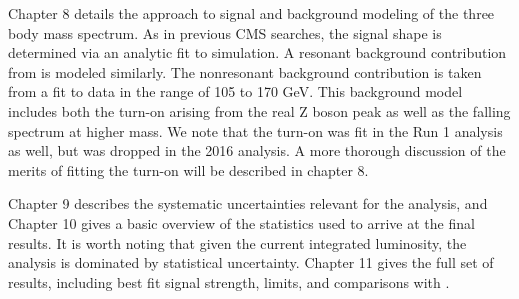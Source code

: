 Chapter 8 details the approach to signal and background modeling of the three body 
mass spectrum. As in previous CMS \hzg searches, the 
signal shape is determined via an analytic fit to simulation. A resonant background 
contribution from \hmumu is modeled similarly. The nonresonant 
background contribution is taken from a fit to data in the range of 105 to 170 GeV. This 
background model includes both the turn-on arising from the real Z boson peak as well as 
the falling spectrum at higher mass. We note that the turn-on was fit in the Run 1 analysis as 
well, but was dropped in the 2016 analysis. A more thorough discussion of the merits of fitting 
the turn-on will be described in chapter 8.

Chapter 9 describes the systematic uncertainties relevant for the analysis, and Chapter 10
gives a basic overview of the statistics used to arrive at the final results. It is 
worth noting that given the current integrated luminosity, the analysis is dominated by 
statistical uncertainty. Chapter 11 gives the full set of results, including best fit 
signal strength, limits, and comparisons with \hgg. 


